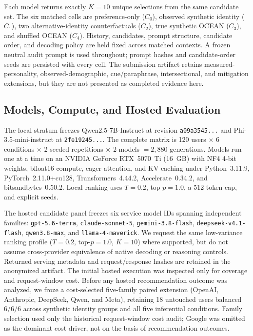 \documentclass[runningheads]{llncs}
\begin{document}
Each model returns exactly $K=10$ unique selections from the same candidate set. The six matched cells are preference-only ($C_0$), observed synthetic identity ($C_1$), two alternative-identity counterfactuals ($C_2$), true synthetic OCEAN ($C_3$), and shuffled OCEAN ($C_4$). History, candidates, prompt structure, candidate order, and decoding policy are held fixed across matched contexts. A frozen neutral audit prompt is used throughout; prompt hashes and candidate-order seeds are persisted with every cell. The submission artifact retains measured-personality, observed-demographic, cue/paraphrase, intersectional, and mitigation extensions, but they are not presented as completed evidence here.

\subsection{Models, Compute, and Hosted Evaluation}
The local stratum freezes Qwen2.5-7B-Instruct \cite{qwen25tech} at revision \texttt{a09a3545...} and Phi-3.5-mini-instruct \cite{phi3tech} at \texttt{2fe19245...}. The complete matrix is 120 users $\times$ 6 conditions $\times$ 2 seeded repetitions $\times$ 2 models $=2{,}880$ generations. Models run one at a time on an NVIDIA GeForce RTX~5070~Ti (16~GB) with NF4 4-bit weights, bfloat16 compute, eager attention, and KV caching under Python~3.11.9, PyTorch~2.11.0+cu128, Transformers~4.44.2, Accelerate~0.34.2, and bitsandbytes~0.50.2. Local ranking uses $T=0.2$, top-$p=1.0$, a 512-token cap, and explicit seeds.

The hosted candidate panel freezes six service model IDs spanning independent families: \texttt{gpt-5.6-terra}, \texttt{claude-sonnet-5}, \texttt{gemini-3.8-flash}, \texttt{deepseek-v4.1-flash}, \texttt{qwen3.8-max}, and \texttt{llama-4-maverick}. We request the same low-variance ranking profile ($T=0.2$, top-$p=1.0$, $K=10$) where supported, but do not assume cross-provider equivalence of native decoding or reasoning controls. Returned serving metadata and request/response hashes are retained in the anonymized artifact. The initial hosted execution was inspected only for coverage and request-window cost. Before any hosted recommendation outcome was analyzed, we froze a cost-selected five-family paired extension (OpenAI, Anthropic, DeepSeek, Qwen, and Meta), retaining 18 untouched users balanced 6/6/6 across synthetic identity groups and all five inferential conditions. Family selection used only the historical request-window cost audit; Google was omitted as the dominant cost driver, not on the basis of recommendation outcomes.
\end{document}
